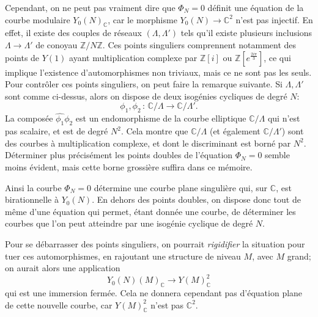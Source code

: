 \documentclass[11pt,a4paper]{article}
\newcommand{\Z}{\mathbb{Z}}
\newcommand{\C}{\mathbb{C}}
\newcommand{\vers}{\longrightarrow}
\newcommand{\de}{\,:\,}
\theoremstyle{definition}
\begin{document}
Cependant, on ne peut pas vraiment dire que $\Phi_N=0$ définit une équation de la courbe modulaire $Y_0(N)_\C$, car le morphisme $Y_0(N)\vers \C^2$ n'est pas injectif. En effet, il existe des couples de réseaux $(\Lambda, \Lambda')$ tels qu'il existe plusieurs inclusions $\Lambda\vers\Lambda'$ de conoyau $\Z/N\Z$. Ces points singuliers comprennent notamment des points de $Y(1)$ ayant multiplication complexe par $\Z[i]$ ou $\Z[e^{\frac{2i\pi}{3}}]$, ce qui implique l'existence d'automorphismes non triviaux, mais ce ne sont pas les seuls. Pour contrôler ces points singuliers, on peut faire la remarque suivante. Si $\Lambda, \Lambda'$ sont comme ci-dessus, alors on dispose de deux isogénies cycliques de degré $N$:
$$\phi_1, \phi_2\de \C/\Lambda \vers \C/\Lambda'.$$
La composée $\widehat{\phi_1} \phi_2$ est un endomorphisme de la courbe elliptique $\C/\Lambda$ qui n'est pas scalaire, et est de degré $N^2$. Cela montre que $\C/\Lambda$ (et également $\C/\Lambda'$) sont des courbes à multiplication complexe, et dont le discriminant est borné par $N^2$. Déterminer plus précisément les points doubles de l'équation $\Phi_N = 0$ semble moins évident, mais cette borne grossière suffira dans ce mémoire.

Ainsi la courbe $\Phi_N=0$ détermine une courbe plane singulière qui, sur $\C$, est birationnelle à $Y_0(N)$. En dehors des points doubles, on dispose donc tout de même d'une équation qui permet, étant donnée une courbe, de déterminer les courbes que l'on peut atteindre par une isogénie cyclique de degré $N$.

Pour se débarrasser des points singuliers, on pourrait \emph{rigidifier} la situation pour tuer ces automorphismes, en rajoutant une structure de niveau $M$, avec $M$ grand; on aurait alors une application
$$Y_0(N)(M)_\C\vers Y(M)_\C^2$$
qui est une immersion fermée. Cela ne donnera cependant pas d'équation plane de cette nouvelle courbe, car $Y(M)_\C^2$ n'est pas $\C^2$.
\end{document}
